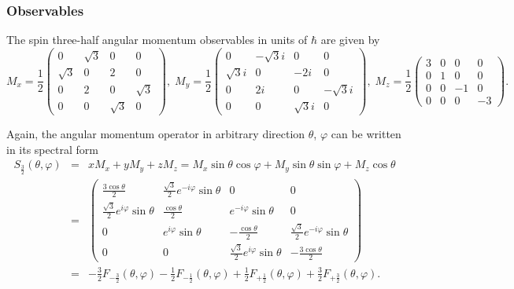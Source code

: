 \documentclass[pra,amsfonts,showpacs,showkeys,preprint]{revtex4}
\begin{document}
\subsubsection*{Observables}
The spin three-half angular momentum observables in units of $\hbar$ are given by~\cite{schiff-55}
\begin{equation}
M_x=
\frac{1}{2}
\left(
\begin{array}{cccccccccc}
0&\sqrt{3}&0&0\\
\sqrt{3}&0&2&0\\
0&2&0&\sqrt{3}\\
0&0&\sqrt{3}&0
\end{array}
\right),
\;
M_y=
\frac{1}{2}
\left(
\begin{array}{ccccccccccr}
0&-\sqrt{3}i&0&0\\
\sqrt{3}i&0&-2i&0\\
0&2i&0&-\sqrt{3}i\\
0&0&\sqrt{3}i&0
\end{array}
\right),
\;
M_z=
\frac{1}{2}
\left(
\begin{array}{cccccccccc}
3&0&0&0\\
0&1&0&0\\
0&0&-1&0\\
0&0&0&-3
\end{array}
\right).
\end{equation}

Again, the angular momentum operator in arbitrary direction $\theta$, $\varphi$ can be written in its spectral form
\begin{equation}
\begin{array}{rcl}
S_\frac{3}{2} (\theta ,\varphi) &=&
xM_x
+
yM_y
+
zM_z
=
 M_x  \sin \theta \cos \varphi
+
M_y   \sin \theta \sin \varphi
+
M_z   \cos \theta
\\
&=&   \left(
\begin{array}{cccc}
 \frac{3 \cos \theta }{2} & \frac{\sqrt{3}}{2}  e^{-i \varphi } \sin \theta  & 0 & 0 \\
 \frac{\sqrt{3}}{2}  e^{i \varphi } \sin \theta  & \frac{\cos \theta }{2} & e^{-i \varphi } \sin \theta  & 0 \\
 0 & e^{i \varphi } \sin \theta  & -\frac{\cos \theta }{2} & \frac{\sqrt{3}}{2}  e^{-i \varphi } \sin \theta  \\
 0 & 0 & \frac{ \sqrt{3}}{2} e^{i \varphi } \sin \theta  & -\frac{3 \cos \theta }{2}
\end{array}
\right)  \\
&=& -\frac{3}{2}F_{-\frac{3}{2}}(\theta ,\varphi) - \frac{1}{2} F_{-\frac{1}{2}}(\theta ,\varphi) +
\frac{1}{2}F_{+\frac{1}{2}}(\theta ,\varphi)+ \frac{3}{2}F_{+\frac{3}{2}}(\theta ,\varphi).
\end{array}
\label{e-2009-gtq-s444}
\end{equation}
\end{document}
